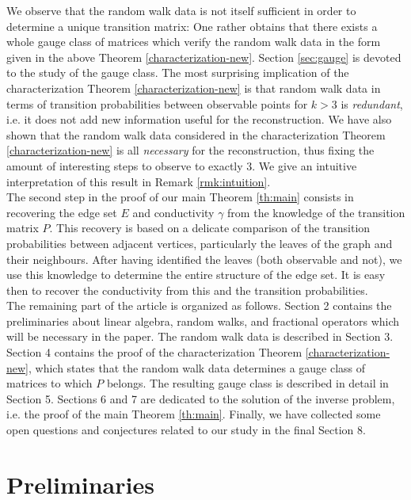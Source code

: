 \documentclass[a4paper,11pt,oneside]{amsart}
\begin{document}
We observe that the random walk data is not itself sufficient in order to determine a unique transition matrix: One rather obtains that there exists a whole gauge class of matrices which verify the random walk data in the form given in the above Theorem \ref{characterization-new}. Section \ref{sec:gauge} is devoted to the study of the gauge class. The most surprising implication of the characterization Theorem \ref{characterization-new} is that random walk data in terms of transition probabilities between observable points for $k>3$ is \emph{redundant}, i.e. it does not add new information useful for the reconstruction. We have also shown that the random walk data considered in the characterization Theorem \ref{characterization-new} is all \emph{necessary} for the reconstruction, thus fixing the amount of interesting steps to observe to exactly $3$. We give an intuitive interpretation of this result in Remark \ref{rmk:intuition}. \\

The second step in the proof of our main Theorem \ref{th:main} consists in recovering the edge set $E$ and conductivity $\gamma$ from the knowledge of the transition matrix $P$. This recovery is based on a delicate comparison of the transition probabilities between adjacent vertices, particularly the leaves of the graph and their neighbours. After having identified the leaves (both observable and not), we use this knowledge to determine the entire structure of the edge set. It is easy then to recover the conductivity from this and the transition probabilities. \\

The remaining part of the article is organized as follows. Section 2 contains the preliminaries about linear algebra, random walks, and fractional operators which will be necessary in the paper. The random walk data is described in Section 3. Section 4 contains the proof of the characterization Theorem \ref{characterization-new}, which states that the random walk data determines a gauge class of matrices to which $P$ belongs.
The resulting gauge class is described in detail in Section 5. Sections 6 and 7 are dedicated to the solution of the inverse problem, i.e. the proof of the main Theorem \ref{th:main}. Finally, we have collected some open questions and conjectures related to our study in the final Section 8.

\section{Preliminaries}\label{sec:preliminaries}
\end{document}
